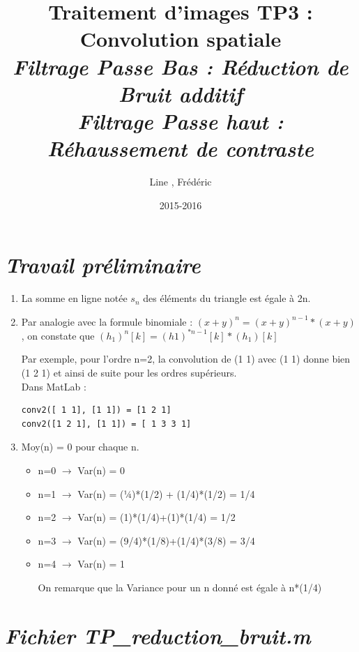 \documentclass{article}
\title{\textbf{Traitement d'images TP3 : Convolution spatiale}\\ \it{Filtrage Passe Bas : Réduction de Bruit additif} \\ \it{Filtrage Passe haut : Réhaussement de contraste}}
\author{Line \bsc{POUVARET}, Frédéric \bsc{DERUE}}
\date{2015-2016}
\begin{document}
\maketitle

\section*{\it{\textbf{Travail préliminaire}}}

\begin{enumerate}[label=\arabic*$\degres$)]
	\item La somme en ligne notée $s_{n}$ des éléments du triangle est égale à 2n.
	\item Par analogie avec la formule binomiale : $(x+y)^{n}=(x+y)^{n-1}*(x+y)$, on constate que $(h_{1})^{n}[k] = (h1)^{*n-1}[k]*(h_{1})[k]$

Par exemple, pour l’ordre n=2, la convolution de (1 1) avec (1 1) donne bien (1 2 1) et ainsi de suite pour les ordres supérieurs.\\

Dans MatLab : 
\begin{lstlisting}
conv2([ 1 1], [1 1]) = [1 2 1]
conv2([1 2 1], [1 1]) = [ 1 3 3 1] 
\end{lstlisting}
	\item 
Moy(n) = 0 pour chaque n.
	\begin{itemize}\renewcommand{\labelitemi}{$\bullet$}
		\item n=0 $\rightarrow$ Var(n) = 0
		\item n=1 $\rightarrow$ Var(n) = (¼)*(1/2) + (1/4)*(1/2) = 1/4
		\item n=2 $\rightarrow$ Var(n) = (1)*(1/4)+(1)*(1/4) = 1/2
		\item n=3 $\rightarrow$ Var(n) = (9/4)*(1/8)+(1/4)*(3/8) = 3/4
		\item n=4 $\rightarrow$ Var(n) = 1
		
On remarque que la Variance pour un n donné est égale à n*(1/4)
	\end{itemize}
	
\end{enumerate}

\section*{\it{\textbf{Fichier TP\_reduction\_bruit.m}}}
\end{document}

